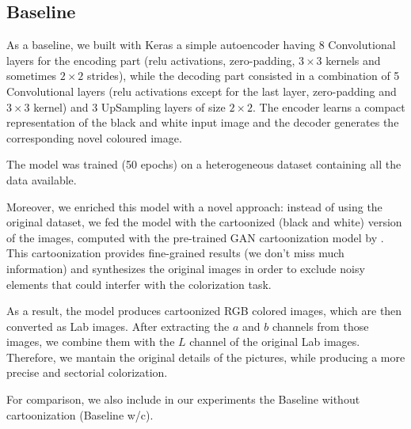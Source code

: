 \subsection{Baseline}
As a baseline, we built with Keras a simple autoencoder having 8 Convolutional layers for the encoding part (relu activations, zero-padding, $3\times3$ kernels and sometimes $2\times2$ strides), while the decoding part consisted in a combination of 5 Convolutional layers (relu activations except for the last layer, zero-padding and $3\times3$ kernel) and 3 UpSampling layers of size $2\times2$. The encoder learns a compact representation of the black and white input image and the decoder generates the corresponding novel coloured image.

The model was trained (50 epochs) on a heterogeneous dataset containing all the data available.

Moreover, we enriched this model with a novel approach: instead of using the original dataset, we fed the model with the cartoonized (black and white) version of the images, computed with the pre-trained GAN cartoonization model by \cite{cartoonize}. This cartoonization provides fine-grained results (we don't miss much information) and synthesizes the original images in order to exclude noisy elements that could interfer with the colorization task.

As a result, the model produces cartoonized RGB colored images, which are then converted as Lab images. After extracting the $a$ and $b$ channels from those images, we combine them with the $L$ channel of the original Lab images. Therefore, we mantain the original details of the pictures, while producing a more precise and sectorial colorization.

For comparison, we also include in our experiments the Baseline without cartoonization (Baseline w/c).